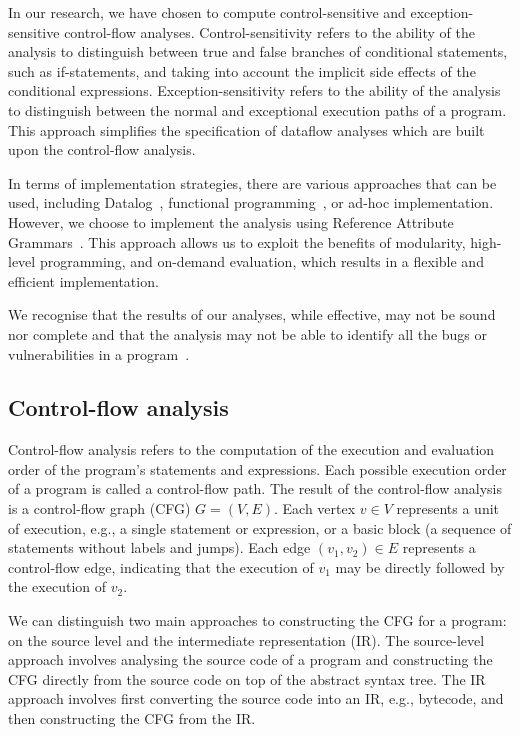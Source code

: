 In our research, we have chosen to compute control-sensitive and
exception-sensitive control-flow analyses.
Control-sensitivity refers to the ability of the analysis to distinguish between
true and false branches of conditional statements, such as if-statements, and
taking into account the implicit side effects of the conditional expressions.
Exception-sensitivity refers to the ability of the analysis to distinguish between
the normal and exceptional execution paths of a program.
This approach simplifies the specification of dataflow analyses which are built upon the
control-flow analysis.

In terms of implementation strategies, there are various approaches that can be
used, including Datalog~\cite{dura2021javadl}, functional programming~\cite{madsen2016datalog}, or ad-hoc implementation.
However, we choose to implement the analysis using Reference Attribute Grammars~\cite{hedin2000rags}.
This approach allows us to exploit the benefits of modularity, high-level programming,
and on-demand evaluation, which results in a flexible and efficient implementation.

We recognise that the results of our analyses, while effective,
may not be sound nor complete and that the analysis may not be able to identify
all the bugs or vulnerabilities in a program~\cite{livshits2015defense}.





\subsection{Control-flow analysis}
Control-flow analysis refers to the computation of
 the execution and evaluation order of the program's statements and expressions.
Each possible execution order of a program is called a control-flow path.
The result of the control-flow analysis is a control-flow graph (CFG) $G=(V,E)$.
Each vertex $v \in V$ represents a unit of execution, e.g., a single statement or expression,
or a basic block (a sequence of statements without labels and jumps).
Each edge $(v_1,v_2) \in E$  represents a control-flow edge, indicating that the
execution of $v_1$ may be directly followed by the execution of $v_2$.

We can distinguish two main approaches to constructing the CFG for a program:
on the source level and the intermediate representation (IR). The source-level approach
involves analysing the source code of a program and constructing the CFG
directly from the source code on top of the abstract syntax tree. The IR approach involves
first converting the source code into an IR, e.g., bytecode,
and then constructing the CFG from the IR.%

